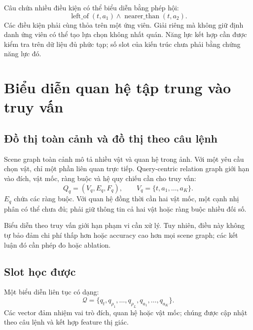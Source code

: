 Câu chứa nhiều điều kiện có thể biểu diễn bằng phép hội:
\begin{equation}
    \operatorname{left\_of}(t,a_1)\land
    \operatorname{nearer\_than}(t,a_2).
    \label{eq:theory-composed}
\end{equation}
Các điều kiện phải cùng thỏa trên một ứng viên. Giải riêng mà không giữ định danh ứng viên có thể tạo lựa chọn không nhất quán. Năng lực kết hợp cần được kiểm tra trên dữ liệu đủ phức tạp; số slot của kiến trúc chưa phải bằng chứng năng lực đó.

\section{Biểu diễn quan hệ tập trung vào truy vấn}
\label{sec:theory-query-graph}

\subsection{Đồ thị toàn cảnh và đồ thị theo câu lệnh}

Scene graph toàn cảnh mô tả nhiều vật và quan hệ trong ảnh. Với một yêu cầu chọn vật, chỉ một phần liên quan trực tiếp. Query-centric relation graph giới hạn vào đích, vật mốc, ràng buộc và hệ quy chiếu cần cho truy vấn:
\begin{equation}
    Q_q=(V_q,E_q,F_q),\qquad V_q=\{t,a_1,\ldots,a_K\}.
    \label{eq:theory-query-graph}
\end{equation}
$E_q$ chứa các ràng buộc. Với quan hệ đồng thời cần hai vật mốc, một cạnh nhị phân có thể chưa đủ; phải giữ thông tin cả hai vật hoặc ràng buộc nhiều đối số.

Biểu diễn theo truy vấn giới hạn phạm vi cần xử lý. Tuy nhiên, điều này không tự bảo đảm chi phí thấp hơn hoặc accuracy cao hơn mọi scene graph; các kết luận đó cần phép đo hoặc ablation.

\subsection{Slot học được}

Một biểu diễn liên tục có dạng:
\begin{equation}
    \mathcal{Q}=\{q_t,q_{\rho_1},\ldots,q_{\rho_L},
                         q_{a_1},\ldots,q_{a_K}\}.
    \label{eq:theory-query-slots}
\end{equation}
Các vector đảm nhiệm vai trò đích, quan hệ hoặc vật mốc; chúng được cập nhật theo câu lệnh và kết hợp feature thị giác.

